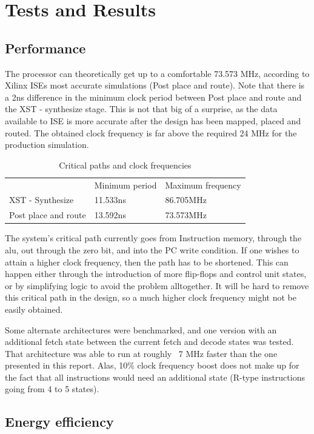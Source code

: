 \section{Tests and Results}

\subsection{Performance}

The processor can theoretically get up to a comfortable 73.573 MHz, according to Xilinx ISEs most accurate simulations (Post place and route).
Note that there is a 2ns difference in the minimum clock period between Post place and route and the XST - synthesize stage.
This is not that big of a surprise, as the data available to ISE is more accurate after the design has been mapped, placed and routed.
The obtained clock frequency is far above the required 24 MHz for the production simulation.

\begin{table}[h]
  \centering
  \begin{tabular}{lll}
    & Minimum period & Maximum frequency \\
    XST - Synthesize & 11.533ns &  86.705MHz \\
    Post place and route & 13.592ns &  73.573MHz \\
  \end{tabular}
  \caption{Critical paths and clock frequencies}
\end{table}

The system's critical path currently goes from Instruction memory, through the alu, out through the zero bit, and into the PC write condition.
If one wishes to attain a higher clock frequency, then the path has to be shortened.
This can happen either through the introduction of more flip-flops and control unit states, or by simplifying logic to avoid the problem alltogether.
It will be hard to remove this critical path in the design, so a much higher clock frequency might not be easily obtained.

Some alternate architectures were benchmarked, and one version with an additional fetch state between the current fetch and decode states was tested.
That architecture was able to run at roughly ~7 MHz faster than the one presented in this report.
Alas, 10\% clock frequency boost does not make up for the fact that all instructions would need an additional state (R-type instructions going from 4 to 5 states).

\subsection{Energy efficiency}

